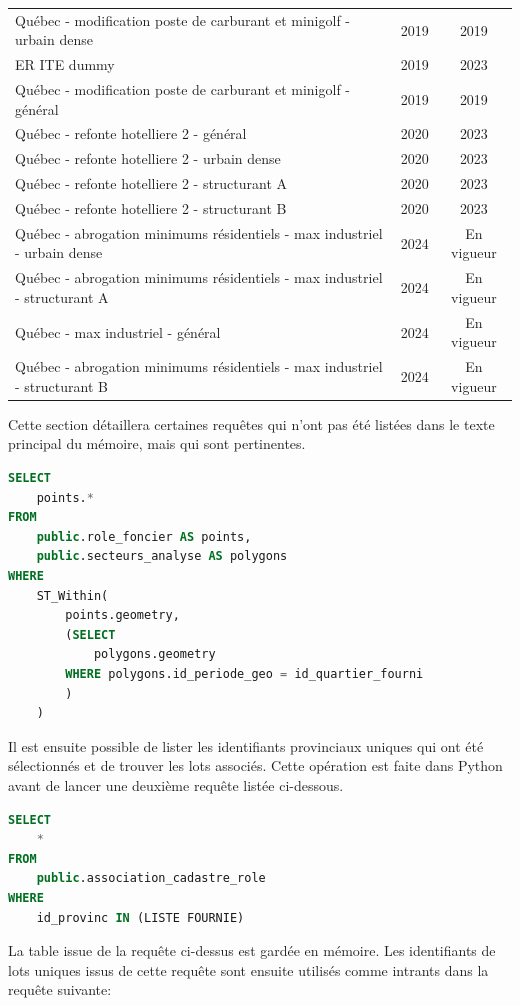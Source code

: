 {\begin{longtable}{p{10cm}cc}
Québec - modification poste de carburant et minigolf - urbain dense & 2019 & 2019 \\
ER ITE dummy & 2019 & 2023 \\
Québec - modification poste de carburant et minigolf - général & 2019 & 2019 \\
Québec - refonte hotelliere 2 - général & 2020 & 2023 \\
Québec - refonte hotelliere 2 - urbain dense & 2020 & 2023 \\
Québec - refonte hotelliere 2 - structurant A & 2020 & 2023 \\
Québec - refonte hotelliere 2 - structurant B & 2020 & 2023 \\
Québec - abrogation minimums résidentiels - max industriel - urbain dense & 2024 & En vigueur \\
Québec - abrogation minimums résidentiels - max industriel - structurant A & 2024 & En vigueur \\
Québec - max industriel - général & 2024 & En vigueur \\
Québec - abrogation minimums résidentiels - max industriel - structurant B & 2024 & En vigueur \\
\end{longtable}}

Cette section détaillera certaines requêtes qui n'ont pas été listées dans le texte principal du mémoire, mais qui sont pertinentes.
\label{sec:annex-select-tax-data}
\begin{lstlisting}[language=SQL, caption=Requête 1 dans tax\_database\_for\_analysis\_territory]
SELECT 
    points.* 
FROM 
    public.role_foncier AS points,
    public.secteurs_analyse AS polygons 
WHERE 
    ST_Within(
        points.geometry,
        (SELECT 
            polygons.geometry 
        WHERE polygons.id_periode_geo = id_quartier_fourni
        )
    )\end{lstlisting}
    Il est ensuite possible de lister les identifiants provinciaux uniques qui ont été sélectionnés et de trouver les lots associés. Cette opération est faite dans Python avant de lancer une deuxième requête listée ci-dessous.
    \begin{lstlisting}[language=SQL, caption=Requête 2 dans tax\_database\_for\_analysis\_territory]
SELECT 
    *
FROM
    public.association_cadastre_role
WHERE 
    id_provinc IN (LISTE FOURNIE)\end{lstlisting}
    \clearpage La table issue de la requête ci-dessus est gardée en mémoire. Les identifiants de lots uniques issus de cette requête sont ensuite utilisés comme intrants dans la requête suivante:
        
